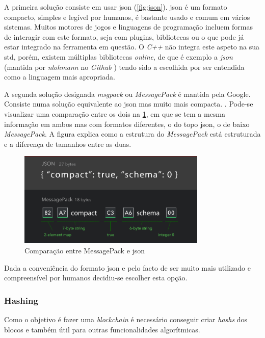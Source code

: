 A primeira solução consiste em usar \acrfull{json} (\cref{fig:json}). \acrshort{json} é um formato compacto, simples e legível por humanos, é bastante usado e comum em vários sistemas. Muitos motores de jogos e linguagens de programação incluem formas de interagir com este formato, seja com plugins, bibliotecas ou o que pode já estar integrado na ferramenta em questão. O \textit{C++} não integra este aspeto na sua \acrfull{std}, porém, existem múltiplas bibliotecas \textit{online}, de que é exemplo a \textit{json} (mantida por \textit{nlohmann} no \textit{Github} \cite{nlohmann_json}) tendo sido a escolhida por ser entendida como a linguagem mais apropriada.


A segunda solução designada \textit{msgpack} ou \textit{MessagePack} é mantida pela Google. Consiste numa solução equivalente ao \acrshort{json} mas muito mais compacta. \cite{msgpack}. Pode-se visualizar uma comparação entre os dois na \cref{fig:msgpackvsjson}, em que se tem a mesma informação em ambos mas com formatos diferentes, o do topo \acrshort{json}, o de baixo \textit{MessagePack}. A figura explica como a estrutura do \textit{MessagePack} está estruturada e a diferença de tamanhos entre as duas.

\begin{figure}[!ht]
    \centering
    \includegraphics[width=0.8\textwidth]{images/jsonvsmsgpack.png}
    \caption{Comparação entre MessagePack e \acrshort{json} \cite{msgpack}}
    \label{fig:msgpackvsjson}
\end{figure}

Dada a conveniência do formato \acrshort{json} e pelo facto de ser muito mais utilizado e compreensível por humanos decidiu-se escolher esta opção.

\subsubsection{Hashing}

Como o objetivo é fazer uma \textit{blockchain} é necessário conseguir criar \textit{hashs} dos blocos e também útil para outras funcionalidades algorítmicas.

